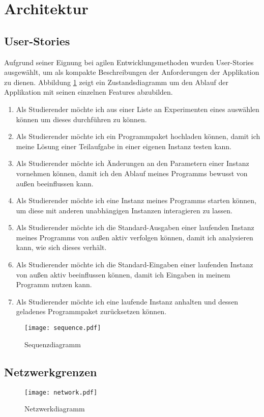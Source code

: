 \section{Architektur}
\subsection{User-Stories}
Aufgrund seiner Eignung bei agilen Entwicklungsmethoden wurden User-Stories ausgewählt, um als kompakte Beschreibungen der Anforderungen der Applikation zu dienen.
Abbildung \ref{fig:sequence} zeigt ein Zustandsdiagramm um den Ablauf der Applikation mit seinen einzelnen Features abzubilden.
\begin{enumerate}
  \item Als Studierender möchte ich aus einer Liste an Experimenten eines auswählen können um dieses durchführen zu können.
  \item Als Studierender möchte ich ein Programmpaket hochladen können, damit ich meine Lösung einer Teilaufgabe in einer eigenen Instanz testen kann.
  \item Als Studierender möchte ich Änderungen an den Parametern einer Instanz vornehmen können, damit ich den Ablauf meines Programms bewusst von außen beeinflussen kann.
  \item Als Studierender möchte ich eine Instanz meines Programms starten können, um diese mit anderen unabhängigen Instanzen interagieren zu lassen.
  \item Als Studierender möchte ich die Standard-Ausgaben einer laufenden Instanz meines Programms von außen aktiv verfolgen können, damit ich analysieren kann, wie sich dieses verhält.
  \item Als Studierender möchte ich die Standard-Eingaben einer laufenden Instanz von außen aktiv beeinflussen können, damit ich Eingaben in meinem Programm nutzen kann.
  \item Als Studierender möchte ich eine laufende Instanz anhalten und dessen geladenes Programmpaket zurücksetzen können.
\end{enumerate}
\begin{landscape}
  \begin{figure}[h]
    \centering
    \texttt{[image: sequence.pdf]}
    \par
    \caption{Sequenzdiagramm}
    \label{fig:sequence}
  \end{figure}
\end{landscape}

\subsection{Netzwerkgrenzen}
  \begin{figure}[h]
    \centering
    \texttt{[image: network.pdf]}
    \caption{Netzwerkdiagramm}
    \label{fig:network}
  \end{figure}
  
